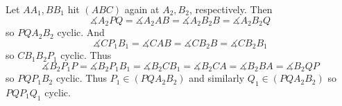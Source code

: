 Let $AA_1,BB_1$ hit $(ABC)$ again at $A_2,B_2$, respectively.
Then \[\measuredangle{A_2PQ}=\measuredangle{A_2AB}=\measuredangle{A_2B_2B}=\measuredangle{A_2B_2Q}\] so $PQA_2B_2$ cyclic.
And \[\measuredangle{CP_1B_1}=\measuredangle{CAB}=\measuredangle{CB_2B}=\measuredangle{CB_2B_1}\] so $CB_1B_2P_1$ cyclic.
Thus \[\measuredangle{B_2P_1P}=\measuredangle{B_2P_1B_1}=\measuredangle{B_2CB_1}=\measuredangle{B_2CA}=\measuredangle{B_2BA}=\measuredangle{B_2QP}\] so $PQP_1B_2$ cyclic.
Thus $P_1\in(PQA_2B_2)$ and similarly $Q_1\in(PQA_2B_2)$ so $PQP_1Q_1$ cyclic.
